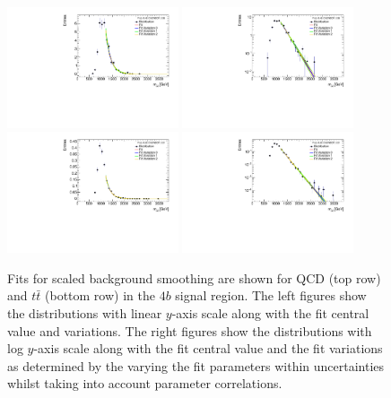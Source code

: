 \begin{figure}[htbp!]
\begin{center}
\includegraphics[width=0.45\textwidth,angle=-90]{figures/boosted/Smooth/qcd_est_FourTag_Signal_mHH_pole.pdf}
\includegraphics[width=0.45\textwidth,angle=-90]{figures/boosted/Smooth/qcd_est_FourTag_Signal_mHH_pole_l.pdf}\\
%   
\includegraphics[width=0.45\textwidth,angle=-90]{figures/boosted/Smooth/ttbar_est_FourTag_Signal_mHH_pole.pdf}
\includegraphics[width=0.45\textwidth,angle=-90]{figures/boosted/Smooth/ttbar_est_FourTag_Signal_mHH_pole_l.pdf}\\
\caption{Fits for scaled background smoothing are shown for QCD (top row) and $t\bar{t}$ (bottom row) in the $4b$ signal region.  The left figures show the distributions with linear $y$-axis scale along with the fit central value and variations. The right figures show the  distributions with log $y$-axis scale along with the fit central value and the fit variations as determined by the varying the fit parameters within uncertainties whilst taking into account parameter correlations. }
\label{fig:signal-region-mjjscaled-4b-smoothing}
\end{center}
\end{figure}

